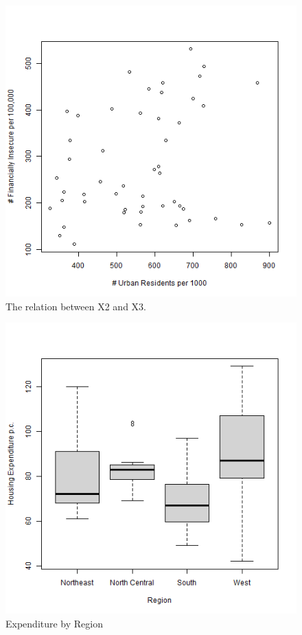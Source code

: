 \documentclass[12pt,letterpaper]{article}
\begin{document}
\begin{figure}[h!]\centering
	\caption{\footnotesize The relation between X2 and X3.}
	\label{fig:plot_6}
	\includegraphics[width=1\textwidth]{X2_X3.png}
\end{figure}

\begin{figure}[h!]\centering
	\caption{\footnotesize Expenditure by Region}
	\label{fig:plot_7}
	\includegraphics[width=1\textwidth]{Y_Region.png}
\end{figure}
\end{document}

